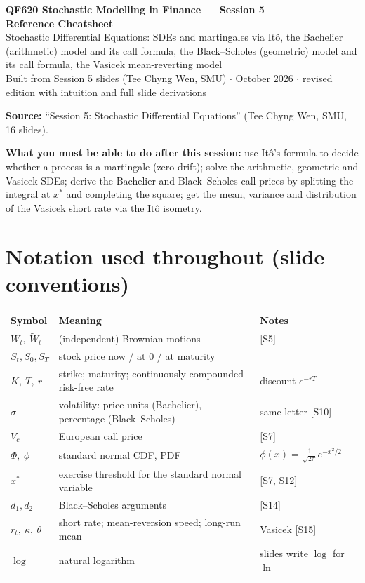 \documentclass[10pt]{article}
\begin{document}
\begin{center}
{\LARGE\bfseries QF620 Stochastic Modelling in Finance --- Session 5\\[2pt] Reference Cheatsheet}\\[6pt]
{\large Stochastic Differential Equations: SDEs and martingales via It\^o, the Bachelier (arithmetic) model and its call formula, the Black--Scholes (geometric) model and its call formula, the Vasicek mean-reverting model}\\[4pt]
{\small Built from Session 5 slides (Tee Chyng Wen, SMU) $\cdot$ October 2026 $\cdot$ revised edition with intuition and full slide derivations}
\end{center}
\tableofcontents
\vspace{4pt}
\textbf{Source:} ``Session 5: Stochastic Differential Equations'' (Tee Chyng Wen, SMU, 16 slides).

\legend

\textbf{What you must be able to do after this session:} use It\^o's formula to decide whether a process is a martingale (zero drift); solve the arithmetic, geometric and Vasicek SDEs; derive the Bachelier and Black--Scholes call prices by splitting the integral at $x^*$ and completing the square; get the mean, variance and distribution of the Vasicek short rate via the It\^o isometry.

\section*{Notation used throughout (slide conventions)}
{\small\renewcommand{\arraystretch}{1.12}
\begin{tabularx}{\linewidth}{@{}l X l@{}}\toprule
Symbol & Meaning & Notes\\\midrule
$W_t,\ \tilde W_t$ & (independent) Brownian motions & [S5]\\
$S_t,S_0,S_T$ & stock price now / at 0 / at maturity & \\
$K,\ T,\ r$ & strike; maturity; continuously compounded risk-free rate & discount $e^{-rT}$\\
$\sigma$ & volatility: price units (Bachelier), percentage (Black--Scholes) & \flag{} same letter [S10]\\
$V_c$ & European call price & [S7]\\
$\Phi,\ \phi$ & standard normal CDF, PDF & $\phi(x)=\frac{1}{\sqrt{2\pi}}e^{-x^2/2}$\\
$x^*$ & exercise threshold for the standard normal variable & [S7, S12]\\
$d_1,d_2$ & Black--Scholes arguments & [S14]\\
$r_t,\ \kappa,\ \theta$ & short rate; mean-reversion speed; long-run mean & Vasicek [S15]\\
$\log$ & natural logarithm & slides write $\log$ for $\ln$\\\bottomrule
\end{tabularx}}
\end{document}
